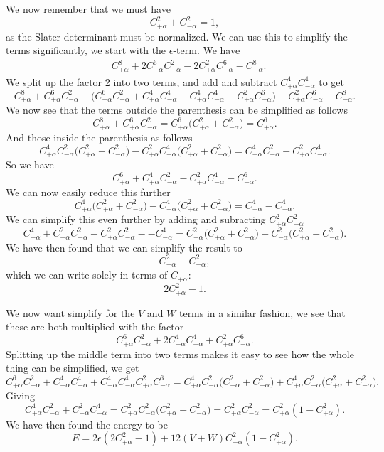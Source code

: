 \documentclass[a4paper, 11pt, notitlepage, english]{article}
\newcommand{\eps}{\epsilon}
\begin{document}
We now remember that we must have
$$C_{+\alpha}^2 + C_{-\alpha}^2 = 1,$$
as the Slater determinant must be normalized. We can use this to simplify the terms significantly, we start with the $\eps$-term. We have
\begin{align*}
&C_{+\alpha}^{8} + 2C_{+\alpha}^{6}C_{-\alpha}^{2} - 2C_{+\alpha}^{2}C_{-\alpha}^{6} - C_{-\alpha}^{8}.
\end{align*}
We split up the factor 2 into two terms, and add and subtract $C_{+\alpha}^4C_{-\alpha}^4$ to get 
$$C_{+\alpha}^{8} + C_{+\alpha}^{6}C_{-\alpha}^{2} + \bigg(C_{+\alpha}^{6}C_{-\alpha}^{2} + C_{+\alpha}^{4}C_{-\alpha}^{4} - C_{+\alpha}^{4}C_{-\alpha}^{4} - C_{+\alpha}^{2}C_{-\alpha}^{6}\bigg) - C_{+\alpha}^{2}C_{-\alpha}^{6} - C_{-\alpha}^{8}.
$$
We now see that the terms outside the parenthesis can be simplified as follows
$$C_{+\alpha}^{8} + C_{+\alpha}^{6}C_{-\alpha}^{2} = C_{+\alpha}^{6}\big(C_{+\alpha}^{2} + C_{-\alpha}^{2}\big) = C_{+\alpha}^{6}.$$
And those inside the parenthesis as follows
$$C_{+\alpha}^{4}C_{-\alpha}^{2}\big(C_{+\alpha}^{2} + C_{-\alpha}^{2}\big) - C_{+\alpha}^{2}C_{-\alpha}^{4}\big(C_{+\alpha}^{2} + C_{-\alpha}^{2}\big) = C_{+\alpha}^{4}C_{-\alpha}^{2} - C_{+\alpha}^{2}C_{-\alpha}^{4}.$$
So we have
$$C_{+\alpha}^{6} + C_{+\alpha}^{4}C_{-\alpha}^{2} - C_{+\alpha}^{2}C_{-\alpha}^{4} - C_{-\alpha}^{6}.$$
We can now easily reduce this further
$$C_{+\alpha}^{4}\big(C_{+\alpha}^{2} + C_{-\alpha}^{2}\big) - C_{+\alpha}^{4}\big(C_{+\alpha}^{2} + C_{-\alpha}^{2}\big) = C_{+\alpha}^{4} - C_{-\alpha}^{4}.$$ 
We can simplify this even further by adding and subracting $C_{+\alpha}^2C_{-\alpha}^2$
$$C_{+\alpha}^{4} + C_{+\alpha}^2C_{-\alpha}^2 - C_{+\alpha}^2C_{-\alpha}^2 -  - C_{-\alpha}^{4} = C_{+\alpha}^{2}\big(C_{+\alpha}^2 + C_{-\alpha}^2\big) - C_{-\alpha}^2\big(C_{+\alpha}^2 + C_{-\alpha}^2\big).$$
We have then found that we can simplify the result to
$$C_{+\alpha}^{2} - C_{-\alpha}^{2},$$
which we can write solely in terms of $C_{+\alpha}$:
$$2C_{+\alpha}^2 - 1.$$

We now want simplify for the $V$ and $W$ terms in a similar fashion, we see that these are both multiplied with the factor
$$C_{+\alpha}^{6}C_{-\alpha}^{2} + 2C_{+\alpha}^{4}C_{-\alpha}^{4} +  C_{+\alpha}^{2}C_{-\alpha}^{6}.$$
Splitting up the middle term into two terms makes it easy to see how the whole thing can be simplified, we get
$$C_{+\alpha}^{6}C_{-\alpha}^{2} + C_{+\alpha}^{4}C_{-\alpha}^{4} + C_{+\alpha}^{4}C_{-\alpha}^{4} C_{+\alpha}^{2}C_{-\alpha}^{6} = C_{+\alpha}^{4}C_{-\alpha}^{2}\big(C_{+\alpha}^{2} + C_{-\alpha}^{2}\big) + C_{+\alpha}^{4}C_{-\alpha}^{2}\big(C_{+\alpha}^{2} + C_{-\alpha}^{2}\big).$$
Giving
$$C_{+\alpha}^{4}C_{-\alpha}^{2} + C_{+\alpha}^{2}C_{-\alpha}^{4} = C_{+\alpha}^{2}C_{-\alpha}^{2}\big(C_{+\alpha}^{2} + C_{-\alpha}^{2}\big) = C_{+\alpha}^{2}C_{-\alpha}^{2} = C_{+\alpha}^{2}(1-C_{+\alpha}^{2}).$$
We have then found the energy to be
$$E = 2\eps(2C_{+\alpha}^{2} - 1) + 12(V+W)C_{+\alpha}^{2}(1-C_{+\alpha}^{2}).$$
\end{document}

